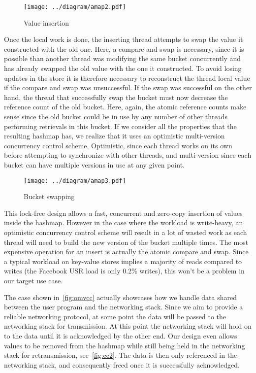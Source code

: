 \documentclass[11pt]{book}
\newcommand{\marios}[1]{\noindent{{\bf \fbox{MK:} {\textcolor{green}{\it#1}}}}}
\begin{document}
\begin{figure}[htb!]
  \texttt{[image: ../diagram/amap2.pdf]}
  \caption{Value insertion}
  \label{fig:omvcc-insert}
\end{figure}

Once the local work is done, the inserting thread attempts to swap the
value it constructed with the old one. Here, a compare and swap is
necessary, since it is possible than another thread was modifying the
same bucket concurrently and has already swapped the old value with
the one it constructed. To avoid losing updates in the store it is
therefore necessary to reconstruct the thread local value if the
compare and swap was unsuccessful. If the swap was successful on the
other hand, the thread that successfully swap the bucket must now
decrease the reference count of the old bucket. Here, again, the
atomic reference counts make sense since the old bucket could be in
use by any number of other threads performing retrievals in this
bucket. If we consider all the properties that the resulting hashmap
has, we realize that it uses an optimistic multi-version concurrency
control scheme. Optimistic, since each thread works on its own before
attempting to synchronize with other threads, and multi-version since
each bucket can have multiple versions in use at any given point.

\begin{figure}
  \texttt{[image: ../diagram/amap3.pdf]}
  \caption{Bucket swapping}
  \label{fig:omvcc-swap}
\end{figure}

This lock-free design allows a fast, concurrent and zero-copy
insertion of values inside the hashmap. However in the case where the
workload is write-heavy, an optimistic concurrency control scheme will
result in a lot of wasted work as each thread will need to build
the new version of the bucket multiple times. The most expensive
operation for an insert is actually the atomic compare and swap. Since
a typical workload on key-value stores implies a majority of reads
compared to writes (the Facebook USR load is only 0.2\% writes)\marios{cite http://www.ece.eng.wayne.edu/~sjiang/pubs/papers/atikoglu12-memcached.pdf}, this
won't be a problem in our target use case.

The case shown in~\ref{fig:omvcc} actually showcases how we handle
data shared between the user program and the networking stack. Since
we aim to provide a reliable networking protocol, at some point the
data will be passed to the networking stack for transmission. At this
point the networking stack will hold on to the data until it is
acknowledged by the other end. Our design even allows values to be
removed from the hashmap while still being held in the networking
stack for retransmission, see~\ref{fig:cc2}. The data is then only
referenced in the networking stack, and consequently freed once it is
successfully acknowledged.
\end{document}
